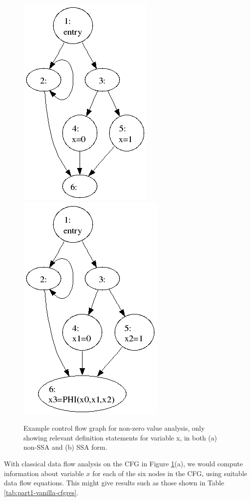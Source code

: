 \begin{figure}
\begin{center}
\includegraphics[scale=0.3]{cfg_example.png}
%
\includegraphics[scale=0.3]{ssa_example.png}
\end{center}
\caption{\label{fig:part1-vanilla-cfgexample}Example control flow graph for
  non-zero value analysis, only showing relevant definition statements for
  variable x, in both (a) non-SSA and (b) SSA form.}
\end{figure}


With classical data flow analysis on the CFG in Figure
\ref{fig:part1-vanilla-cfgexample}(a),
we would compute information about variable $x$ for each of the six nodes
in the CFG, using suitable data flow equations.
This might give results such as those shown in Table
\ref{tab:part1-vanilla-cfgres}.

